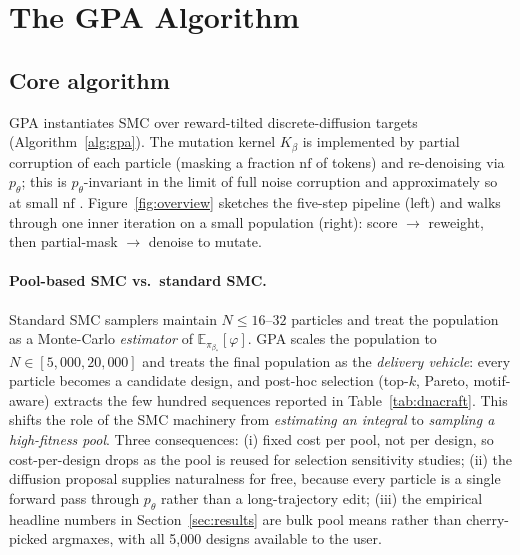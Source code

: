 \documentclass{article}
\theoremstyle{definition}
\theoremstyle{remark}
\newcommand{\gpa}{\textsc{GPA}\xspace}
\newcommand{\E}{\mathbb{E}}
\begin{document}
\section{The GPA Algorithm}\label{sec:method}

\subsection{Core algorithm}\label{sec:method:core}

\gpa{} instantiates SMC over reward-tilted discrete-diffusion targets (Algorithm~\ref{alg:gpa}). The mutation kernel $K_\beta$ is implemented by partial corruption of each particle (masking a fraction $\mathrm{nf}$ of tokens) and re-denoising via $p_\theta$; this is $p_\theta$-invariant in the limit of full noise corruption and approximately so at small $\mathrm{nf}$ \citep{rerd2025}. Figure~\ref{fig:overview} sketches the five-step pipeline (left) and walks through one inner iteration on a small population (right): score $\rightarrow$ reweight, then partial-mask $\rightarrow$ denoise to mutate.

\paragraph{Pool-based SMC vs.\ standard SMC.}
Standard SMC samplers \citep{tds2023,paniouli2025} maintain $N\!\leq\!16$--$32$ particles and treat the population as a Monte-Carlo \emph{estimator} of $\E_{\pi_{\beta_*}}[\varphi]$. \gpa{} scales the population to $N\!\in\![5{,}000,20{,}000]$ and treats the final population as the \emph{delivery vehicle}: every particle becomes a candidate design, and post-hoc selection (top-$k$, Pareto, motif-aware) extracts the few hundred sequences reported in Table~\ref{tab:dnacraft}. This shifts the role of the SMC machinery from \emph{estimating an integral} to \emph{sampling a high-fitness pool}. Three consequences: (i) fixed cost per pool, not per design, so cost-per-design drops as the pool is reused for selection sensitivity studies; (ii) the diffusion proposal supplies naturalness for free, because every particle is a single forward pass through $p_\theta$ rather than a long-trajectory edit; (iii) the empirical headline numbers in Section~\ref{sec:results} are bulk pool means rather than cherry-picked argmaxes, with all 5{,}000 designs available to the user.
\end{document}
